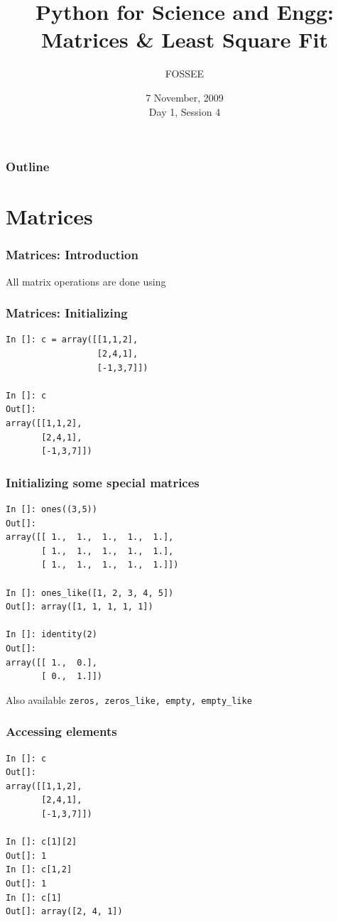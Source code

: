 \documentclass[14pt,compress]{beamer}
\title[Matrices \& Curve Fitting]{Python for Science and Engg: Matrices \& Least Square Fit}
\author[FOSSEE] {FOSSEE}
\institute[IIT Bombay] {Department of Aerospace Engineering\\IIT Bombay}
\date[] {7 November, 2009\\Day 1, Session 4}
\newcommand{\typ}[1]{\lstinline{#1}}
\newcommand{\kwrd}[1]{ \texttt{\textbf{\color{blue}{#1}}}  }
\begin{document}
\begin{frame}
  \titlepage
\end{frame}

\begin{frame}
  \frametitle{Outline}
  \tableofcontents
\end{frame}

\section{Matrices}

\begin{frame}
\frametitle{Matrices: Introduction}
\alert{All matrix operations are done using \kwrd{arrays}}
\end{frame}

\begin{frame}[fragile]
\frametitle{Matrices: Initializing}
\begin{lstlisting}
In []: c = array([[1,1,2],
                  [2,4,1],
                  [-1,3,7]])

In []: c
Out[]: 
array([[1,1,2],
       [2,4,1],
       [-1,3,7]])
\end{lstlisting}
\end{frame}

\begin{frame}[fragile]
\frametitle{Initializing some special matrices}
\begin{small}
  \begin{lstlisting}
In []: ones((3,5))
Out[]: 
array([[ 1.,  1.,  1.,  1.,  1.],
       [ 1.,  1.,  1.,  1.,  1.],
       [ 1.,  1.,  1.,  1.,  1.]])

In []: ones_like([1, 2, 3, 4, 5]) 
Out[]: array([1, 1, 1, 1, 1])   

In []: identity(2)
Out[]: 
array([[ 1.,  0.],
       [ 0.,  1.]])
  \end{lstlisting}
Also available \alert{\typ{zeros, zeros_like, empty, empty_like}}
\end{small}
\end{frame}


\begin{frame}[fragile]
  \frametitle{Accessing elements}
  \begin{lstlisting}
In []: c
Out[]: 
array([[1,1,2],
       [2,4,1],
       [-1,3,7]])

In []: c[1][2]
Out[]: 1
In []: c[1,2]
Out[]: 1
In []: c[1]
Out[]: array([2, 4, 1])
  \end{lstlisting}
\end{frame}
\end{document}
